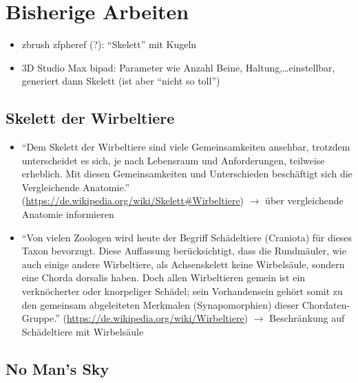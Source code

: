 
\chapter{Bisherige Arbeiten}

\begin{itemize}
 \item zbrush zfpheref (?): "`Skelett"' mit Kugeln %
 \item 3D Studio Max bipad: Parameter wie Anzahl Beine, Haltung,\dots einstellbar, generiert dann Skelett (ist aber "`nicht so toll"') %
\end{itemize}


\section{Skelett der Wirbeltiere}

\begin{itemize}
 \item "`Dem Skelett der Wirbeltiere sind viele Gemeinsamkeiten ansehbar, trotzdem unterscheidet es sich, je nach Lebensraum und Anforderungen, teilweise erheblich. Mit diesen Gemeinsamkeiten und Unterschieden beschäftigt sich die Vergleichende Anatomie."' (\url{https://de.wikipedia.org/wiki/Skelett#Wirbeltiere}) $\rightarrow$ über vergleichende Anatomie informieren
 \item "`Von vielen Zoologen wird heute der Begriff Schädeltiere (Craniota) für dieses Taxon bevorzugt. Diese Auffassung berücksichtigt, dass die Rundmäuler, wie auch einige andere Wirbeltiere, als Achsenskelett keine Wirbelsäule, sondern eine Chorda dorsalis haben. Doch allen Wirbeltieren gemein ist ein verknöcherter oder knorpeliger Schädel; sein Vorhandensein gehört somit zu den gemeinsam abgeleiteten Merkmalen (Synapomorphien) dieser Chordaten-Gruppe."' (\url{https://de.wikipedia.org/wiki/Wirbeltiere}) $\rightarrow$ Beschränkung auf Schädeltiere mit Wirbelsäule
\end{itemize}


\section{No Man's Sky}

